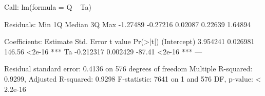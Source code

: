 
Call:
lm(formula = Q ~ Ta)

Residuals:
     Min       1Q   Median       3Q      Max 
-1.27489 -0.27216  0.02087  0.22639  1.64894 

Coefficients:
             Estimate Std. Error t value Pr(>|t|)    
(Intercept)  3.954241   0.026981  146.56   <2e-16 ***
Ta          -0.212317   0.002429  -87.41   <2e-16 ***
---

Residual standard error: 0.4136 on 576 degrees of freedom
Multiple R-squared: 0.9299,	Adjusted R-squared: 0.9298 
F-statistic:  7641 on 1 and 576 DF,  p-value: < 2.2e-16 

